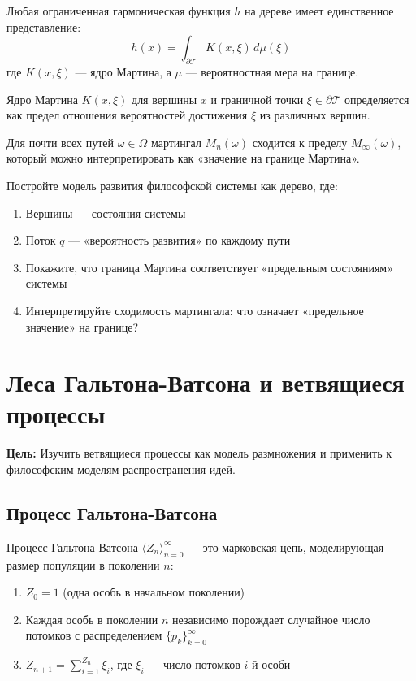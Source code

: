 \documentclass[11pt, a4paper]{extarticle}
\newcommand{\om}{\omega}
\newcommand{\Om}{\Omega}
\newcommand{\Tcal}{{\mathcal T}}
\begin{document}
\begin{theorem}
Любая ограниченная гармоническая функция $h$ на дереве имеет единственное представление:
$$h(x) = \int_{\partial \Tcal} K(x, \xi) \, d\mu(\xi)$$
где $K(x, \xi)$ --- ядро Мартина, а $\mu$ --- вероятностная мера на границе.
\end{theorem}

\begin{definition}
Ядро Мартина $K(x, \xi)$ для вершины $x$ и граничной точки $\xi \in \partial \Tcal$ определяется как предел отношения вероятностей достижения $\xi$ из различных вершин.
\end{definition}

\begin{theorem}
Для почти всех путей $\om \in \Om$ мартингал $M_n(\om)$ сходится к пределу $M_\infty(\om)$, который можно интерпретировать как «значение на границе Мартина».
\end{theorem}

\begin{exercise}
Постройте модель развития философской системы как дерево, где:
\begin{enumerate}
    \item Вершины --- состояния системы
    \item Поток $q$ --- «вероятность развития» по каждому пути
    \item Покажите, что граница Мартина соответствует «предельным состояниям» системы
    \item Интерпретируйте сходимость мартингала: что означает «предельное значение» на границе?
\end{enumerate}
\end{exercise}

\section{Леса Гальтона-Ватсона и ветвящиеся процессы}
\textbf{Цель:} Изучить ветвящиеся процессы как модель размножения и применить к философским моделям распространения идей.

\subsection{Процесс Гальтона-Ватсона}

\begin{definition}
Процесс Гальтона-Ватсона $\langle Z_n \rangle_{n=0}^\infty$ --- это марковская цепь, моделирующая размер популяции в поколении $n$:
\begin{enumerate}
    \item $Z_0 = 1$ (одна особь в начальном поколении)
    \item Каждая особь в поколении $n$ независимо порождает случайное число потомков с распределением $\{p_k\}_{k=0}^\infty$
    \item $Z_{n+1} = \sum_{i=1}^{Z_n} \xi_i$, где $\xi_i$ --- число потомков $i$-й особи
\end{enumerate}
\end{definition}
\end{document}
